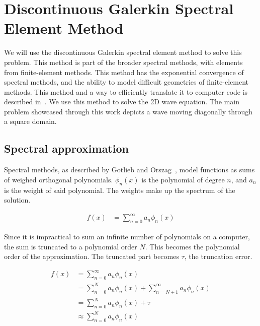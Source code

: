 \chapter{Discontinuous Galerkin Spectral Element Method} \label{chapter:spectral_element_method} 
We will use the discontinuous Galerkin spectral element method to solve this problem. This method is
part of the broader spectral methods, with elements from finite-element methods. This method has the
exponential convergence of spectral methods, and the ability to model difficult geometries of
finite-element methods. This method and a way to efficiently translate it to computer code is
described in~\cite{Kopriva2009}. We use this method to solve the 2D wave equation. The main problem
showcased through this work depicts a wave moving diagonally through a square domain.

\section{Spectral approximation} \label{section:spectral_element_method:spectral_approximation}

Spectral methods, as described by Gotlieb and Orszag~\cite{Gottlieb1977}, model functions as sums of
weighed orthogonal polynomials. $\phi_n(x)$ is the polynomial of degree $n$, and $a_n$ is the weight
of said polynomial. The weights make up the spectrum of the solution.

\begin{equation} \label{equ:infinite_sum}
    \begin{split}
        f(x) & = \sum_{n = 0}^{\infty }a_n \phi_n(x)
    \end{split}
\end{equation}

Since it is impractical to sum an infinite number of polynomials on a computer, the sum is truncated
to a polynomial order $N$. This becomes the polynomial order of the approximation. The truncated
part becomes $\tau$, the truncation error.

\begin{equation} \label{equ:truncated_sum}
    \begin{split}
        f(x) & = \sum_{n = 0}^{\infty }a_n \phi_n(x) \\
        & = \sum_{n = 0}^{N}a_n \phi_n(x) + \sum_{n = N + 1}^{\infty }a_n \phi_n(x) \\
        & = \sum_{n = 0}^{N}a_n \phi_n(x) + \tau \\
        & \approx \sum_{n = 0}^{N}a_n \phi_n(x)
    \end{split}
\end{equation}

